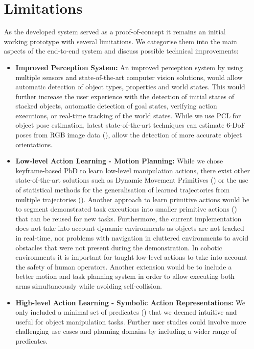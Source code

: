\section{Limitations}
As the developed system served as a proof-of-concept it remains an initial working prototype with several limitations.
We categorise them into the main aspects of the end-to-end system and discuss possible technical improvements:
\begin{itemize}
	\item 
{	\textbf{{Improved Perception System: }}
	An improved perception system by using multiple sensors and state-of-the-art computer vision solutions, would allow automatic detection of object types, properties and world states. This would further increase the user experience with the detection of initial states of stacked objects, automatic detection of goal states, verifying action executions, or real-time tracking of the world states.
	While we use PCL for object pose estimation, latest state-of-the-art techniques can estimate 6-DoF poses from RGB image data (\cite{tremblay2018deep}), allow the detection of more accurate object orientations.}
\item {
	\textbf{{Low-level Action Learning - Motion Planning:}}
	While we chose keyframe-based PbD to learn low-level manipulation actions, there exist other state-of-the-art solutions such as Dynamic Movement Primitives (\cite{pastor2009learning}) or the use of statistical methods for the generalisation of learned trajectories from multiple trajectories (\cite{billard2008robot}).
	Another approach to learn primitive actions would be to segment demonstrated task executions into smaller primitive actions (\cite{kuniyoshi1994learning,wu2010hierarchical}) that can be reused for new tasks.
	Furthermore, the current implementation does not take into account dynamic environments as objects are not tracked in real-time, nor problems with navigation in cluttered environments to avoid obstacles that were not present during the demonstration.
	In cobotic environments it is important for taught low-level actions to take into account the safety of human operators.
	Another extension would be to include a better motion and task planning system in order to allow executing both arms simultaneously while avoiding self-collision.
}
\item {
	\textbf{High-level Action Learning - Symbolic Action Representations:}
	We only included a minimal set of predicates () that we deemed intuitive and useful for object manipulation tasks.
	Further user studies could involve more challenging use cases and planning domains by including a wider range of predicates.
}
\end{itemize}
